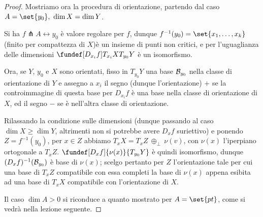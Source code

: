 \begin{proof}
Mostriamo ora la procedura di orientazione, partendo dal caso $A = \set{y_0}, \ \dim X = \dim Y$.

Si ha $f \pitchfork A \leftrightarrow y_0$ è valore regolare per $f$, dunque $f^{-1}(y_0) = \set{x_1, \dots , x_k}$ (finito per compattezza di $X$)\footnotemark è un insieme di punti non critici, e per l'uguaglianza delle dimensioni $\fundef[D_{x_i}f]{T_{x_i} X}{T_{y_0} Y}$ è un isomorfismo.

Ora, se $Y$, $y_0$ e $X$ sono orientati, fisso in $T_{y_0} Y$ una base $\mathcal{B}_{y_0}$ nella classe di orientazione di $Y$ e assegno a $x_i$ il segno (dunque l'orientazione) $+$ se la controimmagine di questa base per $D_{x_i}f$ è una base nella classe di orientazione di $X$, ed il segno $-$ se è nell'altra classe di orientazione.

Rilassando la condizione sulle dimensioni (dunque passando al caso $\dim X \ge \dim Y$, altrimenti non si potrebbe avere $D_x f$ suriettivo) e ponendo $Z = f^{-1}(y_0)$, per $x \in Z$ abbiamo $T_x X = T_x Z ~{\oplus}_{\perp}~ \nu(v)$, con $\nu(x)$ l'iperpiano ortogonale a $T_x Z$. $\fundef[D_x f]{\nu(x)}{T_{y_0} Y}$ è quindi isomorfismo, dunque $(D_x f)^{-1}(\mathcal{B}_{y_0})$ è base di $\nu(x)$; scelgo pertanto per $Z$ l'orientazione tale per cui una base di $T_x Z$ compatibile con essa completi la base di $\nu(x)$ appena esibita ad una base di $T_x X$ compatibile con l'orientazione di $X$. 

Il caso $\dim A > 0$ si riconduce a quanto mostrato per $A = \set{pt}$, come si vedrà nella lezione seguente.
\end{proof}
